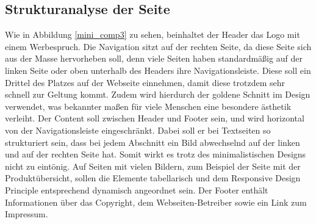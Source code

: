 	\subsection{Strukturanalyse der Seite}
Wie in Abbildung \ref{mini_comp3} zu sehen, beinhaltet der Header das Logo mit einem Werbespruch.
Die Navigation sitzt auf der rechten Seite, da diese Seite sich aus der Masse hervorheben soll, denn viele Seiten haben standardmäßig auf der linken Seite oder oben unterhalb des Headers ihre Navigationsleiste. Diese soll ein Drittel des Platzes auf der Webseite einnehmen, damit diese trotzdem sehr schnell zur Geltung kommt. Zudem wird hierdurch der goldene Schnitt im Design verwendet, was bekannter maßen für viele Menschen eine besondere ästhetik verleiht.
Der Content soll zwischen Header und Footer sein, und wird horizontal von der Navigationsleiste eingeschränkt. Dabei soll er bei Textseiten so strukturiert sein, dass bei jedem Abschnitt ein Bild abwechselnd auf der linken und auf der rechten Seite hat. Somit wirkt es trotz des minimalistischen Designs nicht zu eintönig. Auf Seiten mit vielen Bildern, zum Beispiel der Seite mit der Produktübersicht, sollen die Elemente tabellarisch und dem Responsive Design Principle entsprechend dynamisch angeordnet sein.
Der Footer enthält Informationen über das Copyright, dem Webseiten-Betreiber sowie ein Link zum Impressum.
